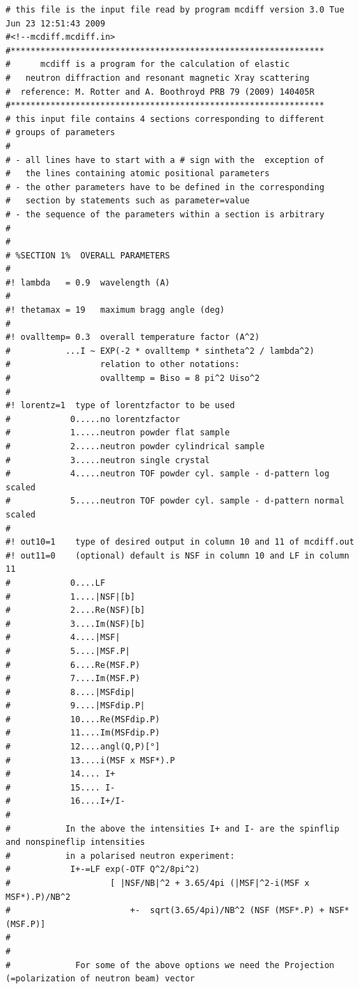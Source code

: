 {\footnotesize
\begin{verbatim}
# this file is the input file read by program mcdiff version 3.0 Tue Jun 23 12:51:43 2009
#<!--mcdiff.mcdiff.in>
#***************************************************************
#      mcdiff is a program for the calculation of elastic
#   neutron diffraction and resonant magnetic Xray scattering 
#  reference: M. Rotter and A. Boothroyd PRB 79 (2009) 140405R
#*************************************************************** 
# this input file contains 4 sections corresponding to different
# groups of parameters
#
# - all lines have to start with a # sign with the  exception of 
#   the lines containing atomic positional parameters
# - the other parameters have to be defined in the corresponding 
#   section by statements such as parameter=value
# - the sequence of the parameters within a section is arbitrary
# 
#
# %SECTION 1%  OVERALL PARAMETERS
#
#! lambda   = 0.9  wavelength (A)
#
#! thetamax = 19   maximum bragg angle (deg)
#
#! ovalltemp= 0.3  overall temperature factor (A^2) 
#           ...I ~ EXP(-2 * ovalltemp * sintheta^2 / lambda^2) 
#                  relation to other notations:
#                  ovalltemp = Biso = 8 pi^2 Uiso^2
#
#! lorentz=1  type of lorentzfactor to be used
#            0.....no lorentzfactor 
#            1.....neutron powder flat sample
#            2.....neutron powder cylindrical sample
#            3.....neutron single crystal
#            4.....neutron TOF powder cyl. sample - d-pattern log scaled
#            5.....neutron TOF powder cyl. sample - d-pattern normal scaled
#
#! out10=1    type of desired output in column 10 and 11 of mcdiff.out
#! out11=0    (optional) default is NSF in column 10 and LF in column 11
#            0....LF
#            1....|NSF|[b]
#            2....Re(NSF)[b]
#            3....Im(NSF)[b]
#            4....|MSF|
#            5....|MSF.P|
#            6....Re(MSF.P)
#            7....Im(MSF.P)
#            8....|MSFdip|
#            9....|MSFdip.P|
#            10....Re(MSFdip.P)
#            11....Im(MSFdip.P)
#            12....angl(Q,P)[°]
#            13....i(MSF x MSF*).P
#            14.... I+
#            15.... I-
#            16....I+/I-
#
#           In the above the intensities I+ and I- are the spinflip and nonspineflip intensities
#           in a polarised neutron experiment:
#            I+-=LF exp(-OTF Q^2/8pi^2) 
#                    [ |NSF/NB|^2 + 3.65/4pi (|MSF|^2-i(MSF x MSF*).P)/NB^2
#                        +-  sqrt(3.65/4pi)/NB^2 (NSF (MSF*.P) + NSF* (MSF.P)]
#
#
#             For some of the above options we need the Projection (=polarization of neutron beam) vector

\end{verbatim}}
